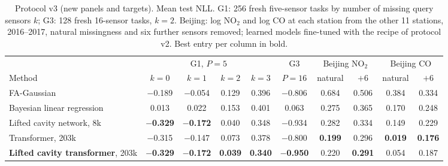 \begin{table}[t]
\centering\scriptsize
\setlength{\tabcolsep}{3pt}
\caption{\label{tab:v3}Protocol v3 (new panels and targets). Mean test NLL. G1: 256 fresh five-sensor tasks by number of missing query sensors $k$; G3: 128 fresh 16-sensor tasks, $k=2$. Beijing: log NO$_2$ and log CO at each station from the other 11 stations, 2016--2017, natural missingness and six further sensors removed; learned models fine-tuned with the recipe of protocol v2. Best entry per column in bold.}
\begin{tabular}{lccccccccc}
\toprule
 & \multicolumn{4}{c}{G1, $P{=}5$} & G3 & \multicolumn{2}{c}{Beijing NO$_2$} & \multicolumn{2}{c}{Beijing CO}\\
Method & $k{=}0$ & $k{=}1$ & $k{=}2$ & $k{=}3$ & $P{=}16$ & natural & $+6$ & natural & $+6$\\
\midrule
FA-Gaussian & $-$0.189 & $-$0.054 & 0.129 & 0.396 & $-$0.806 & 0.684 & 0.506 & 0.384 & 0.334\\
Bayesian linear regression & 0.013 & 0.022 & 0.153 & 0.401 & 0.063 & 0.275 & 0.365 & 0.170 & 0.248\\
\midrule
Lifted cavity network, 8k & \textbf{$-$0.329} & \textbf{$-$0.172} & 0.040 & 0.348 & $-$0.934 & 0.282 & 0.334 & 0.149 & 0.229\\
Transformer, 203k & $-$0.315 & $-$0.147 & 0.073 & 0.378 & $-$0.800 & \textbf{0.199} & 0.296 & \textbf{0.019} & \textbf{0.176}\\
\textbf{Lifted cavity transformer}, 203k & \textbf{$-$0.329} & \textbf{$-$0.172} & \textbf{0.039} & \textbf{0.340} & \textbf{$-$0.950} & 0.220 & \textbf{0.291} & 0.054 & 0.187\\
\bottomrule
\end{tabular}
\end{table}
